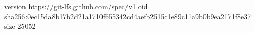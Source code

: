 version https://git-lfs.github.com/spec/v1
oid sha256:0ec15da8b17b2d21a1710f655342cd4aefb2515c1e89c11a9b0b9ea2171f8e37
size 25052
